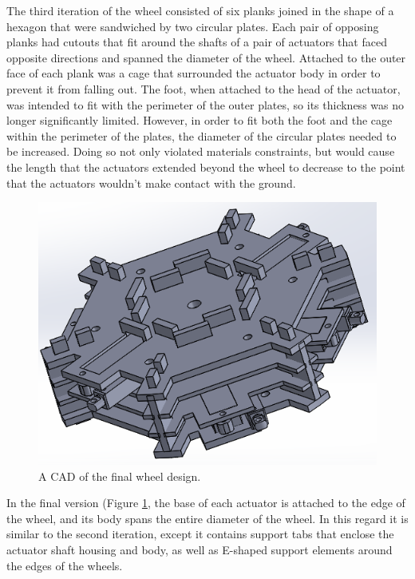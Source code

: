 \documentclass[12pt]{article}
\numberwithin{figure}{section}
\begin{document}
\begin{multicols}{2}
	The third iteration of the wheel consisted of six planks joined in the shape of a hexagon that were sandwiched by two circular plates. Each pair of opposing planks had cutouts that fit around the shafts of a pair of actuators that faced opposite directions and spanned the diameter of the wheel. Attached to the outer face of each plank was a cage that surrounded the actuator body in order to prevent it from falling out. The foot, when attached to the head of the actuator, was intended to fit with the perimeter of the outer plates, so its thickness was no longer significantly limited. However, in order to fit both the foot and the cage within the perimeter of the plates, the diameter of the circular plates needed to be increased. Doing so not only violated materials constraints, but would cause the length that the actuators extended beyond the wheel to decrease to the point that the actuators wouldn’t make contact with the ground.

\begin{figure}[H]
\includegraphics[scale=0.6]{Final_Design.png}
\caption{A CAD of the final wheel design.}
\label{fig:final_wheel_design}
\end{figure}

In the final version (Figure \ref{fig:final_wheel_design}, the base of each actuator is attached to the edge of the wheel, and its body spans the entire diameter of the wheel. In this regard it is similar to the second iteration, except it contains support tabs that enclose the actuator shaft housing and body, as well as E-shaped support elements around the edges of the wheels.


\end{multicols}
\end{document}

